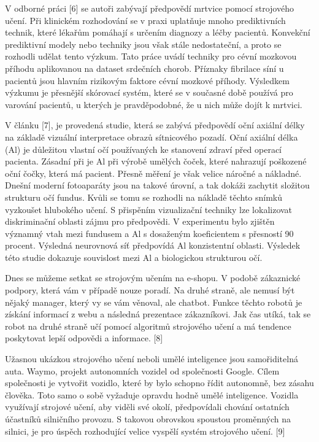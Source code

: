 \documentclass[journal]{IEEEtran}
\begin{document}
  

V odborné práci [6] se autoři zabývají předpovědí mrtvice pomocí strojového učení. Při klinickém rozhodování se v praxi uplatňuje mnoho prediktivních technik, které lékařům pomáhají s určením diagnozy a léčby pacientů. Konvekční prediktivní modely nebo techniky jsou však stále nedostateční, a proto se rozhodli udělat tento výzkum. Tato práce uvádí techniky pro cévní mozkovou příhodu aplikovanou na dataset srdečních chorob. Příznaky fibrilace síní u pacientů jsou hlavním rizikovým faktore cévní mozkové příhody. Výsledkem výzkumu je přesnější skórovací systém, které se v současné době používá pro varování pacientů, u kterých je pravděpodobné, že u nich může dojít k mrtvici. 

  

V článku [7], je provedená studie, která se zabývá předpovědí oční axiální délky na základě vizuální interpretace obrazů sítnicového pozadí. Oční axiální délka (Al) je důležitou vlastní očí používaných ke stanovení zdraví před operací pacienta. Zásadní při je Al při výrobě umělých čoček, které nahrazují poškozené oční čočky, která má pacient. Přesně měření je však velice náročné a nákladné. Dnešní moderní fotoaparáty jsou na takové úrovní, a tak dokáži zachytit složitou strukturu očí fundus. Kvůli se tomu se rozhodli na nákladě těchto snímků vyzkoušet hlubokého učení. S přispěním vizualizační techniky lze lokalizovat diskriminační oblasti zájmu pro předpovědi. V experimentu bylo zjištěn významný vtah mezi fundusem a Al s dosaženým koeficientem s přesností 90 procent. Výsledná neurovnová síť předpovídá Al konzistentní oblasti. Výsledek této studie dokazuje souvislost mezi Al a biologickou strukturou očí. 



Dnes se můžeme setkat se strojovým učením na e-shopu. V podobě zákaznické podpory, která vám v případě nouze poradí. Na druhé straně, ale nemusí být nějaký manager, který vy se vám věnoval, ale chatbot. Funkce těchto robotů je získání informací z webu a následná prezentace zákazníkovi. Jak čas utíká, tak se robot na druhé straně učí pomocí algoritmů strojového učení a má tendence poskytovat lepší odpovědi a informace. [8] 

Užasnou ukázkou strojového učení neboli umělé inteligence jsou samořiditelná auta. Waymo, projekt autonomních vozidel od společnosti Google. Cílem společnosti je vytvořit vozidlo, které by bylo schopno řídit autonomně, bez zásahu člověka. Toto samo o sobě vyžaduje opravdu hodně umělé inteligence. Vozidla využívají strojové učení, aby viděli své okolí, předpovídali chování ostatních účastníků silničního provozu. S takovou obrovskou spoustou proměnných na silnici, je pro úspěch rozhodující velice vyspělí systém strojového učení. [9]
\end{document}
